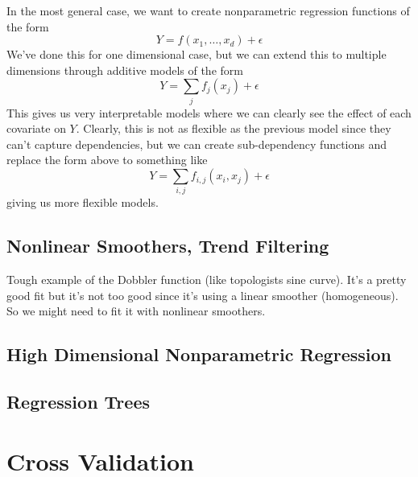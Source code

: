 \documentclass{article}
\begin{document}
    In the most general case, we want to create nonparametric regression functions of the form 
    \begin{equation}
      Y = f(x_1, \ldots, x_d) + \epsilon 
    \end{equation}
    We've done this for one dimensional case, but we can extend this to multiple dimensions through additive models of the form 
    \begin{equation}
      Y = \sum_j f_j (x_j)  + \epsilon
    \end{equation}
    This gives us very interpretable models where we can clearly see the effect of each covariate on $Y$. Clearly, this is not as flexible as the previous model since they can't capture dependencies, but we can create sub-dependency functions and replace the form above to something like 
    \begin{equation}
      Y = \sum_{i, j} f_{i, j} (x_i, x_j) + \epsilon
    \end{equation}
    giving us more flexible models. 
  
  \subsection{Nonlinear Smoothers, Trend Filtering} 

    Tough example of the Dobbler function (like topologists sine curve). It's a pretty good fit but it's not too good since it's using a linear smoother (homogeneous). So we might need to fit it with nonlinear smoothers. 

  \subsection{High Dimensional Nonparametric Regression}

  \subsection{Regression Trees}

\section{Cross Validation} 
\end{document}
